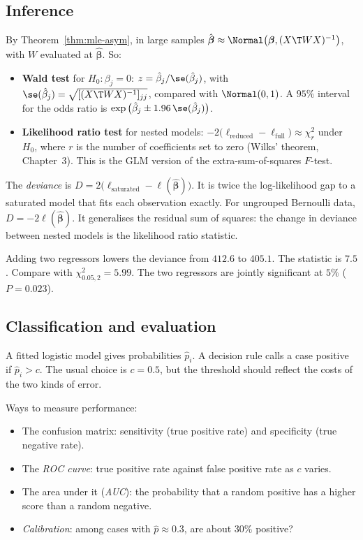 \subsection{Inference}

By Theorem~\ref{thm:mle-asym}, in large samples $\hat{\boldsymbol\beta}\approx\Normal\big(\boldsymbol\beta,(X\T WX)^{-1}\big)$, with $W$ evaluated at $\hat{\boldsymbol\beta}$. So:
\begin{itemize}
  \item \textbf{Wald test} for $H_0:\beta_j=0$: $z=\hat\beta_j/\se(\hat\beta_j)$, with $\se(\hat\beta_j)=\sqrt{[(X\T WX)^{-1}]_{jj}}$, compared with $\Normal(0,1)$. A $95\%$ interval for the odds ratio is $\exp\big(\hat\beta_j\pm1.96\,\se(\hat\beta_j)\big)$.
  \item \textbf{Likelihood ratio test} for nested models: $-2\big(\ell_{\mathrm{reduced}}-\ell_{\mathrm{full}}\big)\approx\chi^2_r$ under $H_0$, where $r$ is the number of coefficients set to zero (Wilks' theorem, Chapter~3). This is the GLM version of the extra-sum-of-squares $F$-test.
\end{itemize}

\begin{definition}[Deviance]
The \emph{deviance} is $D=2\big(\ell_{\mathrm{saturated}}-\ell(\hat{\boldsymbol\beta})\big)$. It is twice the log-likelihood gap to a saturated model that fits each observation exactly. For ungrouped Bernoulli data, $D=-2\ell(\hat{\boldsymbol\beta})$. It generalises the residual sum of squares: the change in deviance between nested models is the likelihood ratio statistic.
\end{definition}

\begin{example}
Adding two regressors lowers the deviance from $412.6$ to $405.1$. The statistic is $7.5$. Compare with $\chi^2_{0.05,2}=5.99$. The two regressors are jointly significant at $5\%$ ($P=0.023$).
\end{example}

\subsection{Classification and evaluation}

A fitted logistic model gives probabilities $\hat{p}_i$. A decision rule calls a case positive if $\hat{p}_i>c$. The usual choice is $c=0.5$, but the threshold should reflect the costs of the two kinds of error.

Ways to measure performance:
\begin{itemize}
  \item The confusion matrix: sensitivity (true positive rate) and specificity (true negative rate).
  \item The \emph{ROC curve}: true positive rate against false positive rate as $c$ varies.
  \item The area under it (\emph{AUC}): the probability that a random positive has a higher score than a random negative.
  \item \emph{Calibration}: among cases with $\hat{p}\approx0.3$, are about $30\%$ positive?
\end{itemize}

